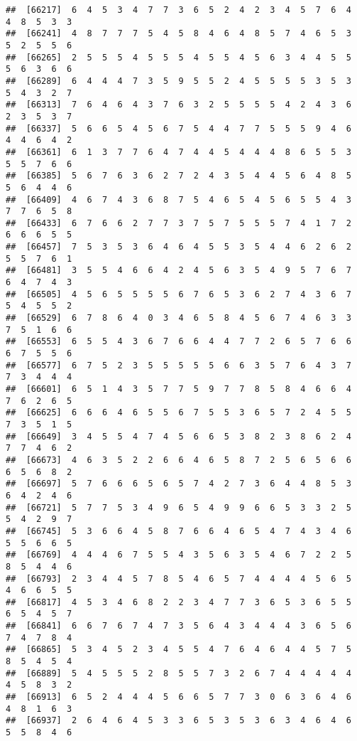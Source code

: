 \documentclass[
]{book}
\begin{document}
\begin{verbatim}
##  [66217]  6  4  5  3  4  7  7  3  6  5  2  4  2  3  4  5  7  6  4  4  8  5  3  3
##  [66241]  4  8  7  7  7  5  4  5  8  4  6  4  8  5  7  4  6  5  3  5  2  5  5  6
##  [66265]  2  5  5  5  4  5  5  5  4  5  5  4  5  6  3  4  4  5  5  5  6  3  6  6
##  [66289]  6  4  4  4  7  3  5  9  5  5  2  4  5  5  5  5  3  5  3  5  4  3  2  7
##  [66313]  7  6  4  6  4  3  7  6  3  2  5  5  5  5  4  2  4  3  6  2  3  5  3  7
##  [66337]  5  6  6  5  4  5  6  7  5  4  4  7  7  5  5  5  9  4  6  4  4  6  4  2
##  [66361]  6  1  3  7  7  6  4  7  4  4  5  4  4  4  8  6  5  5  3  5  5  7  6  6
##  [66385]  5  6  7  6  3  6  2  7  2  4  3  5  4  4  5  6  4  8  5  5  6  4  4  6
##  [66409]  4  6  7  4  3  6  8  7  5  4  6  5  4  5  6  5  5  4  3  7  7  6  5  8
##  [66433]  6  7  6  6  2  7  7  3  7  5  7  5  5  5  7  4  1  7  2  6  6  6  5  5
##  [66457]  7  5  3  5  3  6  4  6  4  5  5  3  5  4  4  6  2  6  2  5  5  7  6  1
##  [66481]  3  5  5  4  6  6  4  2  4  5  6  3  5  4  9  5  7  6  7  6  4  7  4  3
##  [66505]  4  5  6  5  5  5  5  6  7  6  5  3  6  2  7  4  3  6  7  5  4  5  5  2
##  [66529]  6  7  8  6  4  0  3  4  6  5  8  4  5  6  7  4  6  3  3  7  5  1  6  6
##  [66553]  6  5  5  4  3  6  7  6  6  4  4  7  7  2  6  5  7  6  6  6  7  5  5  6
##  [66577]  6  7  5  2  3  5  5  5  5  5  6  6  3  5  7  6  4  3  7  7  3  4  4  4
##  [66601]  6  5  1  4  3  5  7  7  5  9  7  7  8  5  8  4  6  6  4  7  6  2  6  5
##  [66625]  6  6  6  4  6  5  5  6  7  5  5  3  6  5  7  2  4  5  5  7  3  5  1  5
##  [66649]  3  4  5  5  4  7  4  5  6  6  5  3  8  2  3  8  6  2  4  7  7  4  6  2
##  [66673]  4  6  3  5  2  2  6  6  4  6  5  8  7  2  5  6  5  6  6  6  5  6  8  2
##  [66697]  5  7  6  6  6  5  6  5  7  4  2  7  3  6  4  4  8  5  3  6  4  2  4  6
##  [66721]  5  7  7  5  3  4  9  6  5  4  9  9  6  6  5  3  3  2  5  5  4  2  9  7
##  [66745]  5  3  6  6  4  5  8  7  6  6  4  6  5  4  7  4  3  4  6  5  5  6  6  5
##  [66769]  4  4  4  6  7  5  5  4  3  5  6  3  5  4  6  7  2  2  5  8  5  4  4  6
##  [66793]  2  3  4  4  5  7  8  5  4  6  5  7  4  4  4  4  5  6  5  4  6  6  5  5
##  [66817]  4  5  3  4  6  8  2  2  3  4  7  7  3  6  5  3  6  5  5  6  5  4  5  7
##  [66841]  6  6  7  6  7  4  7  3  5  6  4  3  4  4  4  3  6  5  6  7  4  7  8  4
##  [66865]  5  3  4  5  2  3  4  5  5  4  7  6  4  6  4  4  5  7  5  8  5  4  5  4
##  [66889]  5  4  5  5  5  2  8  5  5  7  3  2  6  7  4  4  4  4  4  4  5  8  3  2
##  [66913]  6  5  2  4  4  4  5  6  6  5  7  7  3  0  6  3  6  4  6  4  8  1  6  3
##  [66937]  2  6  4  6  4  5  3  3  6  5  3  5  3  6  3  4  6  4  6  5  5  8  4  6

\end{verbatim}
\end{document}
